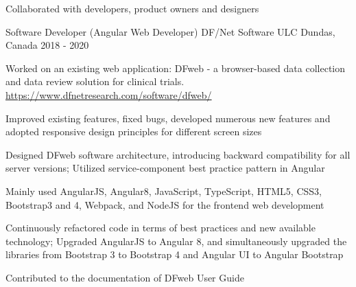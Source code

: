 \begin{cventries}
{\begin{cvitems}
		\item
		{Collaborated with developers, product owners and designers}
	\end{cvitems}
}




  \cventry
{Software Developer (Angular Web Developer)} %
{DF/Net Software ULC} %
{Dundas, Canada} %
{2018 - 2020} %
{Worked on an existing web application: DFweb -  a browser-based data collection and data review solution for clinical trials. \href{https://www.dfnetresearch.com/software/dfweb/}{https://www.dfnetresearch.com/software/dfweb/}
\vspace{6.0mm}
\begin{cvitems}
		\item
		{Improved existing features, fixed bugs, developed numerous new features and adopted responsive design principles for different screen sizes}
		\item
		{Designed DFweb software architecture, introducing backward compatibility for all server versions; Utilized service-component best practice pattern in Angular}
		\item
		{Mainly used AngularJS, Angular8, JavaScript, TypeScript, HTML5, CSS3, Bootstrap3 and 4, Webpack, and NodeJS for the frontend web development}
		\item
		{Continuously refactored code in terms of best practices and new available technology; Upgraded AngularJS to Angular 8, and simultaneously upgraded the libraries from Bootstrap 3 to Bootstrap 4 and Angular UI to Angular Bootstrap }
		\item
		{Contributed to the documentation of DFweb User Guide}
	\end{cvitems}
}

	




\end{cventries}
